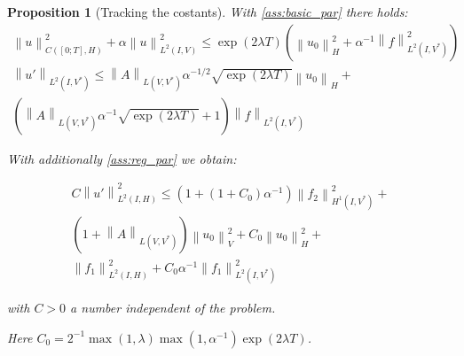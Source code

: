 \documentclass[english,a4paper,12pt,oneside]{scrbook}
\theoremstyle{break}
\newtheorem{prop}[equation]{Proposition}
\theoremstyle{remark}
\newcommand{\ds}{\displaystyle}
\newcommand{\norm}[1]{\left\lVert#1\right\rVert}
\newcommand{\HN}[1]{\norm{#1}_{H}}
\newcommand{\VN}[1]{\norm{#1}_{V}}
\begin{document}
\begin{prop}[Tracking the costants]
\label{thm:const_track}
With \cref{ass:basic_par} there holds:
\begin{align}
\norm{u}^2_{C([0;T],H)}+\alpha\norm{u}_{L^2(I,V)}^2\leq \exp(2\lambda T)(\HN{u_0}^2+\alpha^{-1}\norm{f}^2_{L^2(I,V^*)})\\
\norm{u'}_{L^2(I,V^*)}\leq \norm{A}_{L(V,V^*)}\alpha^{-1/2}\sqrt{\exp(2\lambda T)}\HN{u_0} +\\\left (\norm{A}_{L(V,V^*)}\alpha^{-1}\sqrt{\exp(2\lambda T)}+1\right ) \norm{f}_{L^2(I,V^*)}
\end{align}

With additionally \cref{ass:reg_par} we obtain:

\begin{align}
C\norm{u'}^2_{L^2(I,H)}\leq 
(1+(1+C_0)\alpha^{-1})\norm{f_2}_{H^1(I,V^*)}^2+\\
(1+\norm{A}_{L(V,V^*)})\VN{u_{0}}^2+C_0\HN{u_0}^2+\\
\norm{f_1}_{L^2(I,H)}^2+C_0\alpha^{-1}\norm{f_1}^2_{L^2(I,V^*)}
\end{align}

with $C>0$ a number independent of the problem.

Here $C_0 = \ds 2^{-1}\max(1,\lambda)\max(1,\alpha^{-1})\exp(2\lambda T)$.

\end{prop}
\end{document}

